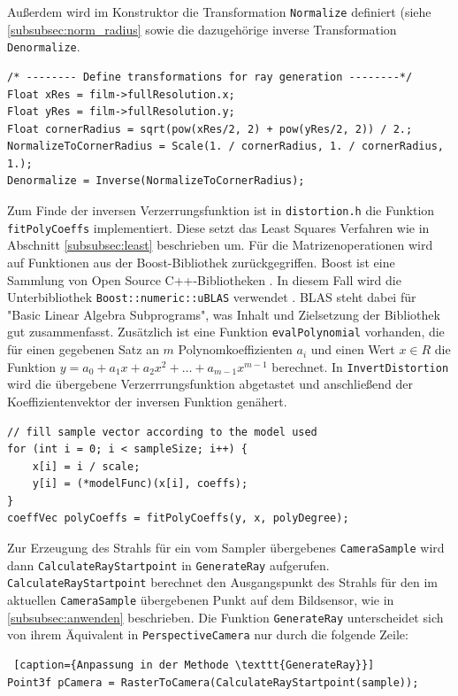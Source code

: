 Außerdem wird im Konstruktor die Transformation \texttt{Normalize} definiert (siehe \ref{subsubsec:norm_radius} sowie die dazugehörige inverse Transformation \texttt{Denormalize}.
\newpage
\begin{lstlisting}[caption={Transformation zur Normalisierung der Pixelkoordinten}]
/* -------- Define transformations for ray generation --------*/
Float xRes = film->fullResolution.x;
Float yRes = film->fullResolution.y;
Float cornerRadius = sqrt(pow(xRes/2, 2) + pow(yRes/2, 2)) / 2.;
NormalizeToCornerRadius = Scale(1. / cornerRadius, 1. / cornerRadius, 1.);
Denormalize = Inverse(NormalizeToCornerRadius);
\end{lstlisting}

Zum Finde der inversen Verzerrungsfunktion ist in \texttt{distortion.h} die Funktion \texttt{fitPolyCoeffs} implementiert. Diese setzt das Least Squares Verfahren wie in Abschnitt \ref{subsubsec:least} beschrieben um. Für die Matrizenoperationen wird auf Funktionen aus der Boost-Bibliothek zurückgegriffen. Boost ist eine Sammlung von Open Source C++-Bibliotheken \cite{boost}. In diesem Fall wird die Unterbibliothek \texttt{Boost::numeric::uBLAS} verwendet \cite{ublas}. BLAS steht dabei für "Basic Linear Algebra Subprograms", was Inhalt und Zielsetzung der Bibliothek gut zusammenfasst. Zusätzlich ist eine Funktion \texttt{evalPolynomial} vorhanden, die für einen gegebenen Satz an $m$ Polynomkoeffizienten $a_i$ und einen Wert $x \in R$ die Funktion $y = a_0 + a_1 x + a_2 x^2 + \dots + a_{m-1} x^{m-1}$ berechnet. In \texttt{InvertDistortion} wird die übergebene Verzerrrungsfunktion abgetastet und anschließend der Koeffizientenvektor der inversen Funktion genähert.
\begin{lstlisting}[caption={"Abtasten" des Verzerrungsmodells und Invertierung}]
// fill sample vector according to the model used
for (int i = 0; i < sampleSize; i++) {
	x[i] = i / scale;
	y[i] = (*modelFunc)(x[i], coeffs);
}
coeffVec polyCoeffs = fitPolyCoeffs(y, x, polyDegree);
\end{lstlisting}

Zur Erzeugung des Strahls für ein vom Sampler übergebenes \texttt{CameraSample} wird dann \texttt{CalculateRayStartpoint} in \texttt{GenerateRay} aufgerufen. \texttt{CalculateRayStartpoint} berechnet den Ausgangspunkt des Strahls für den im aktuellen \texttt{CameraSample} übergebenen Punkt auf dem Bildsensor, wie in \ref{subsubsec:anwenden} beschrieben. Die Funktion \texttt{GenerateRay} unterscheidet sich von ihrem Äquivalent in \texttt{PerspectiveCamera} nur durch die folgende Zeile:
\begin{lstlisting} [caption={Anpassung in der Methode \texttt{GenerateRay}}]
Point3f pCamera = RasterToCamera(CalculateRayStartpoint(sample));
\end{lstlisting}

